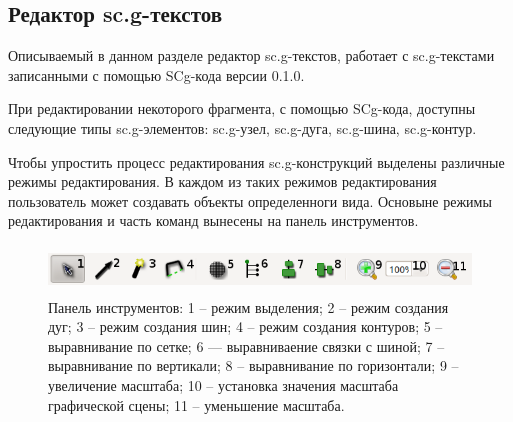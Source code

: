 
\subsection{Редактор sc.g-текстов}

Описываемый в данном разделе редактор sc.g-текстов, работает с sc.g-текстами записанными с помощью SCg-кода версии 0.1.0.

При редактировании некоторого фрагмента, с помощью SCg-кода, доступны следующие типы sc.g-элементов: {\sf sc.g-узел}, {\sf sc.g-дуга}, {\sf sc.g-шина}, {\sf sc.g-контур}.
 
Чтобы упростить процесс редактирования sc.g-конструкций выделены различные режимы редактирования. В каждом из таких режимов редактирования пользователь может создавать объекты определенноги вида. Основыне режимы редактирования и часть команд вынесены на панель инструментов. 
\begin{figure}[h]
	\includegraphics[width=15.77cm, height=1.27cm]{../images/scgtoolbar.png}
	\caption{Панель инструментов: 1 – режим выделения; 2 – режим создания дуг; 3 – режим создания шин; 4 – режим создания контуров; 5 – выравнивание по сетке; 6 — выравниваение связки с шиной; 
7 – выравнивание по вертикали; 8 – выравнивание по горизонтали; 9 – увеличение масштаба; 10 – установка значения масштаба графической сцены; 11 – уменьшение масштаба.}
	\label{scgtoolbar}
\end{figure}

